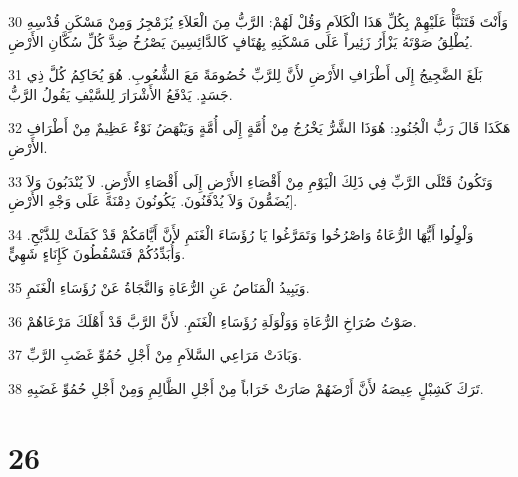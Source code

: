 \par 30 وَأَنْتَ فَتَنَبَّأْ عَلَيْهِمْ بِكُلِّ هَذَا الْكَلاَمِ وَقُلْ لَهُمْ: الرَّبُّ مِنَ الْعَلاَءِ يُزَمْجِرُ وَمِنْ مَسْكَنِ قُدْسِهِ يُطْلِقُ صَوْتَهُ يَزْأَرُ زَئِيراً عَلَى مَسْكَنِهِ بِهُتَافٍ كَالدَّائِسِينَ يَصْرُخُ ضِدَّ كُلِّ سُكَّانِ الأَرْضِ.
\par 31 بَلَغَ الضَّجِيجُ إِلَى أَطْرَافِ الأَرْضِ لأَنَّ لِلرَّبِّ خُصُومَةً مَعَ الشُّعُوبِ. هُوَ يُحَاكِمُ كُلَّ ذِي جَسَدٍ. يَدْفَعُ الأَشْرَارَ لِلسَّيْفِ يَقُولُ الرَّبُّ.
\par 32 هَكَذَا قَالَ رَبُّ الْجُنُودِ: هُوَذَا الشَّرُّ يَخْرُجُ مِنْ أُمَّةٍ إِلَى أُمَّةٍ وَيَنْهَضُ نَوْءٌ عَظِيمٌ مِنْ أَطْرَافِ الأَرْضِ.
\par 33 وَتَكُونُ قَتْلَى الرَّبِّ فِي ذَلِكَ الْيَوْمِ مِنْ أَقْصَاءِ الأَرْضِ إِلَى أَقْصَاءِ الأَرْضِ. لاَ يُنْدَبُونَ وَلاَ يُضَمُّونَ وَلاَ يُدْفَنُونَ. يَكُونُونَ دِمْنَةً عَلَى وَجْهِ الأَرْضِ].
\par 34 وَلْوِلُوا أَيُّهَا الرُّعَاةُ وَاصْرُخُوا وَتَمَرَّغُوا يَا رُؤَسَاءَ الْغَنَمِ لأَنَّ أَيَّامَكُمْ قَدْ كَمَلَتْ لِلذَّبْحِ. وَأُبَدِّدُكُمْ فَتَسْقُطُونَ كَإِنَاءٍ شَهِيٍّ.
\par 35 وَيَبِيدُ الْمَنَاصُ عَنِ الرُّعَاةِ وَالنَّجَاةُ عَنْ رُؤَسَاءِ الْغَنَمِ.
\par 36 صَوْتُ صُرَاخِ الرُّعَاةِ وَوَلْوَلَةِ رُؤَسَاءِ الْغَنَمِ. لأَنَّ الرَّبَّ قَدْ أَهْلَكَ مَرْعَاهُمْ.
\par 37 وَبَادَتْ مَرَاعِي السَّلاَمِ مِنْ أَجْلِ حُمُوِّ غَضَبِ الرَّبِّ.
\par 38 تَرَكَ كَشِبْلٍ عِيصَهُ لأَنَّ أَرْضَهُمْ صَارَتْ خَرَاباً مِنْ أَجْلِ الظَّالِمِ وَمِنْ أَجْلِ حُمُوِّ غَضَبِهِ.

\chapter{26}

